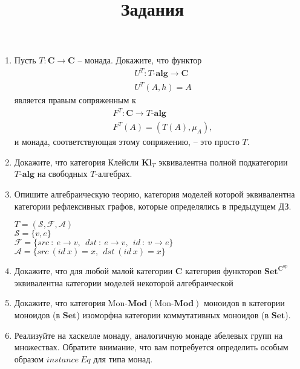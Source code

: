 \documentclass[draft]{article}
\newcommand{\cat}[1]{\mathbf{#1}}
\renewcommand{\C}{\cat{C}}
\newcommand{\Set}{\cat{Set}}
\newcommand{\fs}[1]{\mathrm{#1}}
\newcommand{\Mod}[1]{#1\text{-}\cat{Mod}}
\begin{document}
\title{Задания}
\maketitle

\begin{enumerate}

\item Пусть $T : \C \to \C$ -- монада.
Докажите, что функтор
\begin{align*}
& U^T : T\text{-}\cat{alg} \to \C \\
& U^T(A,h) = A
\end{align*}
является правым сопряженным к
\begin{align*}
& F^T : \C \to T\text{-}\cat{alg} \\
& F^T(A) = (T(A), \mu_A),
\end{align*}
и монада, соответствующая этому сопряжению, -- это просто $T$.

\item Докажите, что категория Клейсли $\cat{Kl}_T$ эквивалентна полной подкатегории $T\text{-}\cat{alg}$ на свободных $T$-алгебрах.



\item Опишите алгебраическую теорию, категория моделей которой эквивалентна категории рефлексивных графов, которые определялись в предыдущем ДЗ.

$T = (\mathcal{S},\mathcal{F}, \mathcal{A})$\\
$\mathcal{S} = \{v, e\}$\\
$\mathcal{F} = \{src~:~e\to v,~~dst ~:~ e \to v, ~~ id ~:~ v \to e\}$\\
$\mathcal{A} = \{ src ~(id~x) = x,~~ dst ~(id~x) = x\}$

\item Докажите, что для любой малой категории $\C$ категория функторов $\Set^{\C^\fs{op}}$ эквивалентна категории моделей некоторой алгебраической 

\item Докажите, что категория $\Mod{\fs{Mon}}(\Mod{\fs{Mon}})$ моноидов в категории моноидов (в $\Set$) изоморфна категории коммутативных моноидов (в $\Set$).

\item Реализуйте на хаскелле монаду, аналогичную монаде абелевых групп на множествах.
Обратите внимание, что вам потребуется определить особым образом $\mathit{instance}\ \mathit{Eq}$ для типа монад.


\end{enumerate}
\end{document}
